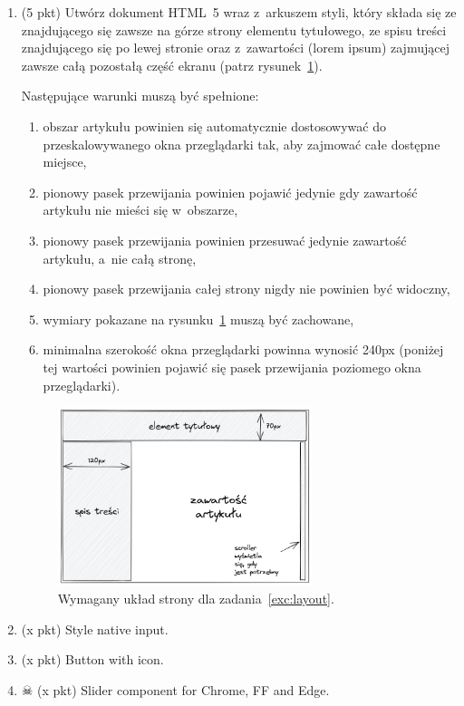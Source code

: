 \documentclass[12pt]{article}
\begin{document}
\begin{enumerate}
        \item\label{exc:layout}
            (5 pkt) Utwórz dokument HTML~5 wraz z~arkuszem styli, który składa się ze znajdującego się zawsze na górze strony elementu tytułowego, ze spisu treści znajdującego się po lewej stronie oraz z~zawartości (lorem ipsum) zajmującej zawsze całą pozostałą część ekranu (patrz rysunek~\ref{fig:layout}).

            Następujące warunki muszą być spełnione:
            \begin{enumerate}
                \item obszar artykułu powinien się automatycznie dostosowywać do przeskalowywanego okna przeglądarki tak, aby zajmować całe dostępne miejsce,
                \item pionowy pasek przewijania powinien pojawić jedynie gdy zawartość artykułu nie mieści się w~obszarze,
                \item pionowy pasek przewijania powinien przesuwać jedynie zawartość artykułu, a~nie całą stronę,
                \item pionowy pasek przewijania całej strony nigdy nie powinien być widoczny,
                \item wymiary pokazane na rysunku~\ref{fig:layout} muszą być zachowane,
                \item minimalna szerokość okna przeglądarki powinna wynosić 240px (poniżej tej wartości powinien pojawić się pasek przewijania poziomego okna przeglądarki).
            \end{enumerate}

            \begin{figure}[p]
                \centering
                \includegraphics[width=0.7\textwidth]{zad2}
                \caption{Wymagany układ strony dla zadania~\ref{exc:layout}.}
                \label{fig:layout}
            \end{figure}

        \item\label{exc:native-input}
            (x pkt) Style native input.

        \item\label{exc:button-with-icon}
            (x pkt) Button with icon.

        \item\label{exc:range-with-knob}
        $\skull$ (x pkt) Slider component for Chrome, FF and Edge.

    \end{enumerate}
\end{document}
